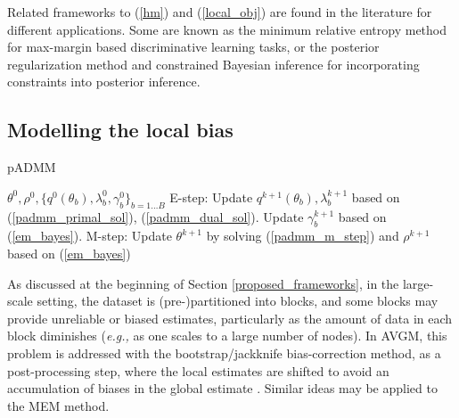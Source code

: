 \documentclass{article}
\newcommand{\eg}[0]{\emph{e.g., }}
\newcommand{\1}[0]{\ensuremath{\boldsymbol{1}}\xspace}
\begin{document}
Related frameworks to (\ref{hm}) and (\ref{local_obj}) are found in the literature for different applications. Some are known as the minimum relative entropy method \cite{Jaakkola1999, Zhu2012} for max-margin based discriminative learning tasks, or the posterior regularization method \cite{Ganchev2010} and constrained Bayesian inference \cite{Koyejo2013} for incorporating constraints into posterior inference.

\subsection{Modelling the local bias}\label{pADMM}

\begin{algorithm}[tb]
   \caption{pADMM}
   \label{alg:pADMM}
\begin{algorithmic}
    $\theta^0, \rho^0, \{q^0(\theta_b), \lambda_b^0, \gamma_b^0\}_{b=1\ldots B}$
   \STATE E-step: 
   \STATE Update $q^{k+1}(\theta_b), \lambda_b^{k+1}$ based on (\ref{padmm_primal_sol}), (\ref{padmm_dual_sol}).
   \STATE Update $\gamma_b^{k+1}$ based on (\ref{em_bayes}).
   \ENDFOR
   \STATE M-step:
   \STATE Update $\theta^{k+1}$ by solving (\ref{padmm_m_step}) and $\rho^{k+1}$ based on (\ref{em_bayes})
   \ENDFOR
\end{algorithmic}
\end{algorithm}
As discussed at the beginning of Section \ref{proposed_frameworks}, in the large-scale setting, the dataset is (pre-)partitioned into blocks, and some blocks may provide unreliable or biased estimates, particularly as the amount of data in each block diminishes (\eg as one scales to a large number of nodes). In AVGM, this problem is addressed with the bootstrap/jackknife bias-correction method, as a post-processing step, where the local estimates are shifted to avoid an accumulation of biases in the global estimate \cite{YZhang2012, Scott2013}. Similar ideas may be applied to the MEM method.
\end{document}
